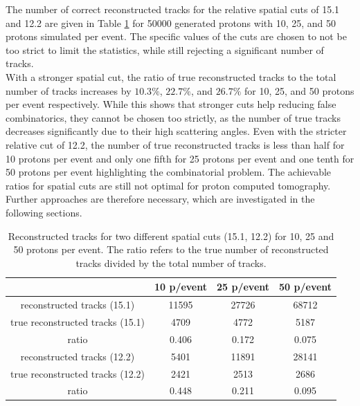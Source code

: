 The number of correct reconstructed tracks for the relative spatial cuts of 15.1 and 12.2 are given in Table
\ref{tab:true_tracks} for 50000 generated protons with 10,
25, and 50 protons simulated per event. The specific values of the cuts are chosen to not be too strict to limit the statistics, while still rejecting a significant number
of tracks.\\
With a stronger spatial cut,  the ratio of true reconstructed tracks to
the total number of tracks increases by $10.3\%$, $22.7\%$, and $26.7\%$ for 10, 25, and 50 protons per event respectively.
While this shows that stronger cuts help reducing false combinatorics, they cannot be chosen too strictly,
as the number of true tracks decreases significantly due to their high scattering angles. Even with the stricter relative cut of 12.2, the
number of true reconstructed tracks is less than half for 10 protons per event and only one fifth for 25 protons per event and one tenth for 50 protons per event highlighting
the combinatorial problem. The achievable ratios for spatial cuts are still not optimal for proton computed tomography.
Further approaches are therefore necessary, which are investigated in the following sections.

\begin{table}
  \centering
  \caption{Reconstructed tracks for two different spatial cuts (15.1, 12.2) for 10, 25 and 50 protons per event. The ratio refers to the true
  number of reconstructed tracks divided by the total number of tracks.}
  \begin{tabular}{c | c c c}
    \toprule
     & 10 p/event & 25 p/event & 50 p/event \\
    \midrule
    reconstructed tracks (15.1) & 11595 & 27726 & 68712  \\
    true reconstructed tracks (15.1) & 4709 & 4772  & 5187 \\
    ratio & 0.406 & 0.172 & 0.075 \\
    \midrule
    reconstructed tracks (12.2) & 5401 & 11891 & 28141 \\
    true reconstructed tracks (12.2) &  2421 &2513  & 2686 \\
    ratio & 0.448 & 0.211 & 0.095
  \end{tabular}
  \label{tab:true_tracks}
\end{table}


